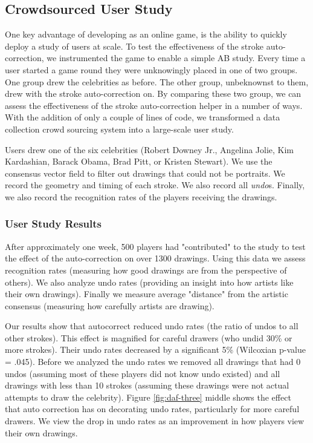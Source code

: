 \subsection {Crowdsourced User Study}

One key advantage of developing \daf as an online game, is the ability to quickly deploy a study of users at scale. To test the effectiveness of the stroke auto-correction, we instrumented the game to enable a simple AB study. Every time a user started a game round they were unknowingly placed in one of two groups. One group drew the celebrities as before. The other group, unbeknownst to them, drew with the stroke auto-correction on. By comparing these two group, we can assess the effectiveness of the stroke auto-correction helper in a number of ways. With the addition of only a couple of lines of code, we transformed a data collection crowd sourcing system into a large-scale user study.

Users drew one of the six celebrities (Robert Downey Jr., Angelina Jolie, Kim Kardashian, Barack Obama, Brad Pitt, or Kristen Stewart). We use the consensus vector field to filter out drawings that could not be portraits. We record the geometry and timing of each stroke. We also record all {\em undo}s. Finally, we also record the recognition rates of the players receiving the drawings.

\subsubsection {User Study Results}

After approximately one week, 500 players had "contributed" to the study to test the effect of the auto-correction on over 1300 drawings. Using this data we assess recognition rates (measuring how good drawings are from the perspective of others). We also analyze undo rates (providing an insight into how artists like their own drawings). Finally we measure average "distance" from the artistic consensus (measuring how carefully artists are drawing).

Our results show that autocorrect reduced undo rates (the ratio of undos to all other strokes). This effect is magnified for careful drawers (who undid 30\% or more strokes). Their undo rates decreased by a significant 5\% (Wilcoxian p-value = .045).  Before we analyzed the undo rates we removed all drawings that had 0 undos (assuming most of these players did not know undo existed) and all drawings with less than 10 strokes (assuming these drawings were not actual attempts to draw the celebrity).  Figure \ref{fig:daf-three} middle shows the effect that auto correction has on decorating undo rates, particularly for more careful drawers. We view the drop in undo rates as an improvement in how players view their own drawings.

